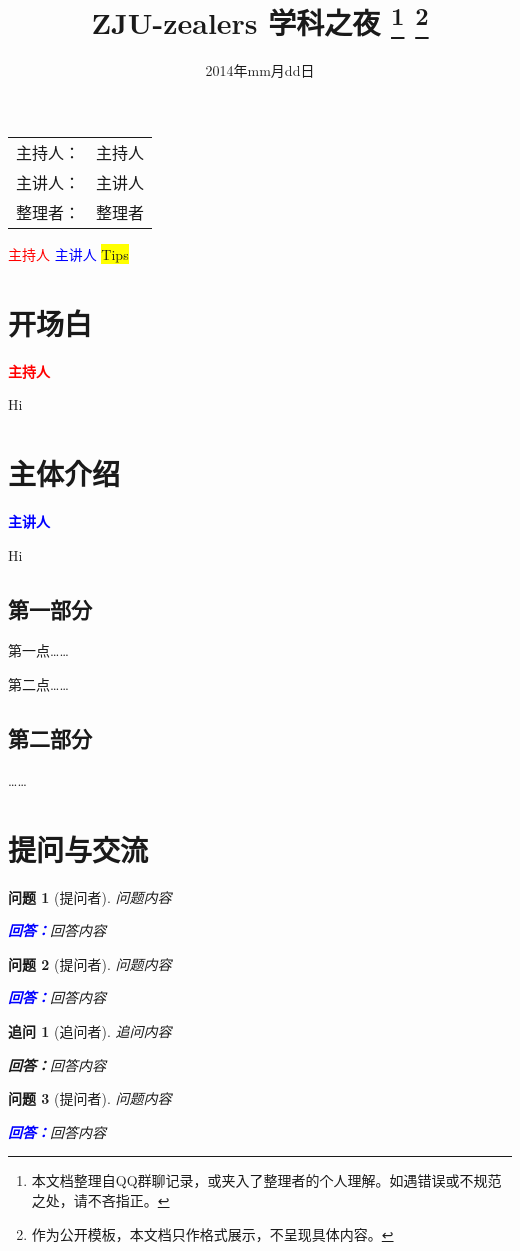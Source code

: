 \documentclass[a4paper,12pt]{ctexart}
\title{\textbf{ZJU-zealers 学科之夜}%
	\footnote{本文档整理自QQ群聊记录，或夹入了整理者的个人理解。如遇错误或不规范之处，请不吝指正。}
	\footnote{作为公开模板，本文档只作格式展示，不呈现具体内容。}
}
\author{}
\date{2014年mm月dd日}
\theoremstyle{Question}
\newtheorem{question}{\color{magenta}问题}
\theoremstyle{postQuestion}
\newtheorem*{postquestion}{\color{magenta!50}追问}
\newcommand{\answer}{\par\noindent\textbf{\textcolor{blue}{回答：}}\normalfont\songti}
\newcommand{\postanswer}{\par\textbf{\textcolor{blue!50}{回答：}}\rmfamily\songti}
\newcommand\host[1][主持人]{\textcolor{red}{\bf#1}\par}
\newcommand\lecturer[1][主讲人]{\textcolor{blue}{\bf#1}\par}
\newcommand{\info}[3]{\begin{table}[h]
  \centering
  \begin{tabu}{>{\heiti}X[2,r]>{\kaishu}X[3]}
  	主持人： & #1  \\
  	主讲人： & #2  \\
  	整理者： & #3
  \end{tabu}
\end{table}
}
\begin{document}
\maketitle
\info{主持人} %
	 {主讲人} %
	 {整理者} %
	 
\begin{center}
	\textcolor{red}{主持人} \quad \textcolor{blue}{主讲人} \quad \colorbox{yellow}{Tips}
\end{center}

\tableofcontents

\section{开场白}
\host
Hi

\section{主体介绍}
\lecturer
Hi

\subsection{第一部分}
第一点……

第二点……

\subsection{第二部分}
……


\section{提问与交流}
\begin{question}[提问者]
  问题内容
  
  \answer  回答内容
\end{question}

\begin{question}[提问者]
  问题内容
  
  \answer  回答内容
\end{question}

\begin{postquestion}[追问者]
  追问内容
  
  \postanswer 回答内容
\end{postquestion}

\begin{question}[提问者]
  问题内容
  
  \answer  回答内容
\end{question}
\end{document}
